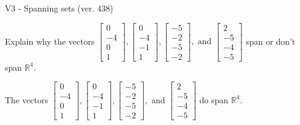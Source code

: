 \begin{exercise}
  \begin{exerciseTitle}V3 - Spanning sets (ver. 438)\end{exerciseTitle}
  \begin{exerciseStatement}
    Explain why the vectors \(\left[\begin{array}{r}
0 \\
-4 \\
0 \\
1
\end{array}\right] , \left[\begin{array}{r}
0 \\
-4 \\
-1 \\
1
\end{array}\right] , \left[\begin{array}{r}
-5 \\
-2 \\
-5 \\
-2
\end{array}\right] , \text{ and } \left[\begin{array}{r}
2 \\
-5 \\
-4 \\
-5
\end{array}\right]\) span or don't span \(\mathbb{R}^4\). 
	


  \end{exerciseStatement}
  \begin{exerciseAnswer}
   The vectors \(\left[\begin{array}{r}
0 \\
-4 \\
0 \\
1
\end{array}\right] , \left[\begin{array}{r}
0 \\
-4 \\
-1 \\
1
\end{array}\right] , \left[\begin{array}{r}
-5 \\
-2 \\
-5 \\
-2
\end{array}\right] , \text{ and } \left[\begin{array}{r}
2 \\
-5 \\
-4 \\
-5
\end{array}\right]\) 
  	 do  
	span \(\mathbb{R}^4\).
  


  \end{exerciseAnswer}
\end{exercise}